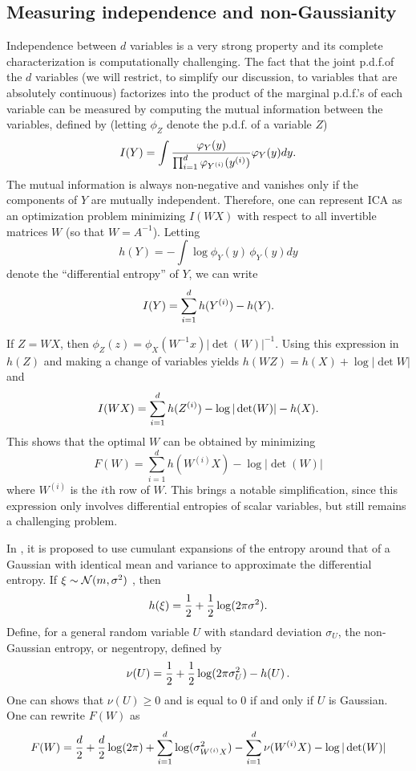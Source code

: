 \subsection{Measuring independence and non-Gaussianity}

Independence between $d$ variables is a very strong property and its complete characterization is computationally challenging. The fact that the joint p.d.f.of the $d$ variables  (we will restrict, to simplify our discussion, to variables that are absolutely continuous) factorizes into the product of the marginal p.d.f.'s of each variable can be measured by computing the mutual information between the variables, defined by (letting $\phi_Z$ denote the p.d.f. of a variable $Z$)
\[
I(Y) = \int \frac{\varphi_Y(y)}{\prod_{i=1}^d \varphi_{Y^{(i)}}(y^{(i)})} \varphi_Y(y) dy.
\]
The mutual information is always non-negative and vanishes only if the components of $Y$ are mutually independent.
Therefore, one can represent ICA as an optimization problem minimizing $I(WX)$ with respect to all invertible matrices $W$ (so that $W = A^{-1}$). Letting
\[
h(Y) = - \int \log \phi_Y(y)\, \phi_Y(y) dy
\]
denote the ``differential entropy'' of $Y$, we can write
\[
I(Y) = \sum_{i=1}^d h(Y^{(i)}) - h(Y).
\]

If $Z = WX$, then $\phi_Z(z) = \phi_X(W^{-1}x) |\det(W)|^{-1}$. Using this expression in $h(Z)$ and making a change of variables yields $h(WZ) = h(X) + \log |\det W|$ and 
\[
I(WX) = \sum_{i=1}^d h(Z^{(i)}) - \log |\det(W)| - h(X).
\]
This shows that the optimal $W$ can be obtained by minimizing
\[
F(W) =  \sum_{i=1}^d h(W^{(i)}X) - \log |\det(W)|
\]
where $W^{(i)}$ is the $i$th row of $W$. This brings a notable simplification, since this expression only involves differential entropies of scalar variables, but still remains a  challenging problem. 

In \citet{comon1994independent}, it is proposed to use cumulant expansions of the entropy around that of a Gaussian with identical mean and variance to approximate the differential entropy. If $\xi \sim {\mathcal N}(m, \sigma^2)$ , then
\[
h(\xi) = \frac12 + \frac12 \log(2\pi\sigma^2).
\]
Define, for a general random variable $U$ with standard deviation $\sigma_U$, the non-Gaussian entropy, or negentropy, defined by 
\[
\nu(U) = \frac12 + \frac12 \log(2\pi\sigma_U^2) - h(U)\,.
\]
One can shows that $\nu(U) \geq 0$ and is equal to 0 if and only if $U$ is Gaussian. One can rewrite $F(W)$ as 
\[
F(W) =  \frac d2 + \frac d2 \log(2\pi) + \sum_{i=1}^d \log(\sigma_{W^{(i)}X}^2) - \sum_{i=1}^d \nu(W^{(i)}X) - \log |\det(W)|
\]


